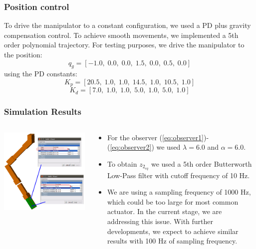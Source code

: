 \documentclass[9pt,spanish,aspectratio=1610]{beamer}
\begin{document}
\begin{frame}\frametitle{Position control}
  To drive the manipulator to a constant configuration, we used a PD plus gravity compensation control. To achieve smooth movements, we implemented a 5th order polynomial trajectory. For testing purposes, we drive the manipulator to the position:
  \[q_g = [-1.0,\;0.0,\;0.0,\;1.5,\;0.0,\;0.5,\;0.0]\]
  using the PD constants:
  \[K_p = [20.5,\; 1.0,\; 1.0,\; 14.5,\; 1.0,\; 10.5,\; 1.0]\]
\[ K_d=[7.0,\; 1.0,\; 1.0,\; 5.0,\; 1.0,\; 5.0,\; 1.0]\]
\end{frame}

\begin{frame}\frametitle{Simulation Results}
  \begin{columns}
    \begin{column}{0.45\textwidth}
      \includegraphics[width=\textwidth]{Figures/object_mass.png}
    \end{column}
    \begin{column}{0.55\textwidth}
      \begin{itemize}
      \item For the observer (\ref{eq:observer1})-(\ref{eq:observer2}) we used $\lambda=6.0$ and $\alpha=6.0$.
      \item To obtain $z_{2_{eq}}$ we used a 5th order Butterworth Low-Pass filter with cutoff frequency of 10 Hz.
      \item We are using a sampling frequency of 1000 Hz, which could be too large for most common actuator. In the current stage, we are addressing this issue. With further developments, we expect to achieve similar results with 100 Hz of sampling frequency.

\end{itemize}
\end{column}
\end{columns}
\end{frame}
\end{document}
